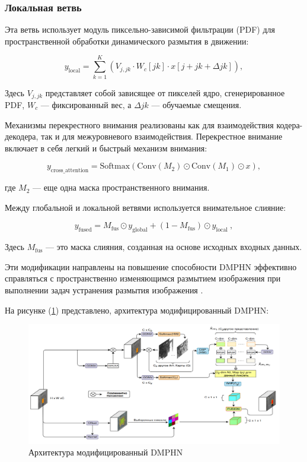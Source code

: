 \subsubsection*{Локальная ветвь} Эта ветвь использует модуль пиксельно-зависимой фильтрации (PDF) для пространственной обработки динамического размытия в движении:

\begin{equation}
	y_{\text{local}} = \sum_{k=1}^{K} \left( V_{j,jk} \cdot W_{c}[jk] \cdot x[j + jk + \Delta jk] \right),
\end{equation}

Здесь \(V_{j,jk}\) представляет собой зависящее от пикселей ядро, сгенерированное PDF, \(W_{c}\) — фиксированный вес, а \(\Delta jk\) — обучаемые смещения.

Механизмы перекрестного внимания реализованы как для взаимодействия кодера-декодера, так и для межуровневого взаимодействия. Перекрестное внимание включает в себя легкий и быстрый механизм внимания:

\begin{equation}
	y_{\text{cross\_attention}} = \text{Softmax}(\text{Conv}(M_{2}) \odot \text{Conv}(M_{1}) \odot x),
\end{equation}

где \(M_{2}\) — еще одна маска пространственного внимания.

Между глобальной и локальной ветвями используется внимательное слияние:

\begin{equation}
	y_{\text{fused}} = M_{\text{fus}} \odot y_{\text{global}} + (1 - M_{\text{fus}}) \odot y_{\text{local }},
\end{equation}

Здесь \(M_{\text{fus}}\) — это маска слияния, созданная на основе исходных входных данных.

Эти модификации направлены на повышение способности DMPHN эффективно справляться с пространственно изменяющимся размытием изображения при выполнении задач устранения размытия изображения \cite{suin2020spatially}.

На рисунке (\ref{fig:modified-dmphn}) представлено, архитектура модифицированный DMPHN: 
\begin{figure}[H]
	\centering
	\includegraphics[width=0.7\linewidth]{assets/modified-DMPHN.png}
	\caption{Архитектура модифицированный DMPHN}
	\label{fig:modified-dmphn}
\end{figure}

